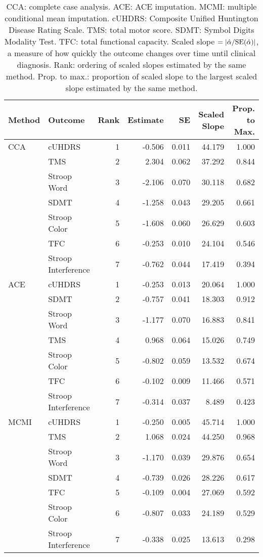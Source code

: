 \documentclass[12pt]{article}
\begin{document}
\begin{table}[hbt!]
\footnotesize
\centering
\begin{tabular}{llrrrrr}
  \hline
Method & Outcome & Rank & Estimate & SE & Scaled Slope & Prop. to Max. \\ 
  \hline
CCA & cUHDRS & 1 & -0.506 & 0.011 & 44.179 & 1.000 \\ 
  & TMS & 2 & 2.304 & 0.062 & 37.292 & 0.844 \\ 
  & Stroop Word & 3 & -2.106 & 0.070 & 30.118 & 0.682 \\ 
  & SDMT & 4 & -1.258 & 0.043 & 29.205 & 0.661 \\ 
  & Stroop Color & 5 & -1.608 & 0.060 & 26.629 & 0.603 \\ 
  & TFC & 6 & -0.253 & 0.010 & 24.104 & 0.546 \\ 
  & Stroop Interference & 7 & -0.762 & 0.044 & 17.419 & 0.394 \\ 
  \rowcolor[gray]{0.75}ACE & cUHDRS & 1 & -0.253 & 0.013 & 20.064 & 1.000 \\ 
  \rowcolor[gray]{0.75}& SDMT & 2 & -0.757 & 0.041 & 18.303 & 0.912 \\ 
  \rowcolor[gray]{0.75}& Stroop Word & 3 & -1.177 & 0.070 & 16.883 & 0.841 \\ 
  \rowcolor[gray]{0.75}& TMS & 4 & 0.968 & 0.064 & 15.026 & 0.749 \\ 
  \rowcolor[gray]{0.75}& Stroop Color & 5 & -0.802 & 0.059 & 13.532 & 0.674 \\ 
  \rowcolor[gray]{0.75}& TFC & 6 & -0.102 & 0.009 & 11.466 & 0.571 \\ 
  \rowcolor[gray]{0.75}& Stroop Interference & 7 & -0.314 & 0.037 & 8.489 & 0.423 \\ 

  MCMI & cUHDRS & 1 & -0.250 & 0.005 & 45.714 & 1.000 \\ 
  & TMS & 2 & 1.068 & 0.024 & 44.250 & 0.968 \\
  
  & Stroop Word & 3 & -1.170 & 0.039 & 29.876 & 0.654 \\ 
  & SDMT & 4 & -0.739 & 0.026 & 28.226 & 0.617 \\ 
  & TFC & 5 & -0.109 & 0.004 & 27.069 & 0.592 \\ 
  & Stroop Color & 6 & -0.807 & 0.033 & 24.189 & 0.529 \\ 
  & Stroop Interference & 7 & -0.338 & 0.025 & 13.613 & 0.298 \\ 
   \hline
\end{tabular}
\caption{CCA: complete case analysis. ACE: ACE imputation. %
MCMI: multiple conditional mean imputation. cUHDRS: Composite Unified Huntington Disease Rating Scale. TMS: total motor score. SDMT: Symbol Digits Modality Test. TFC: total functional capacity. Scaled slope $= |\hat{\alpha} / {\rm SE}(\hat{\alpha})|$, a measure of how quickly the outcome changes over time until clinical diagnosis. Rank: ordering of scaled slopes estimated by the same method. Prop. to max.: proportion of scaled slope to the largest scaled slope estimated by the same method.}
\label{table:rank_slopes}
\end{table}
\end{document}
